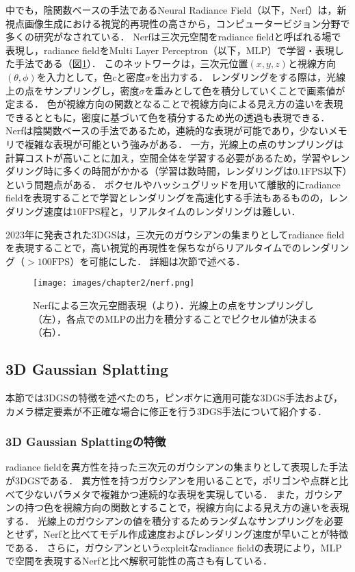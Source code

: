 中でも，陰関数ベースの手法であるNeural Radiance Field（以下，Nerf）\cite{nerf}は，新視点画像生成における視覚的再現性の高さから，コンピュータービジョン分野で多くの研究がなされている．
Nerfは三次元空間をradiance fieldと呼ばれる場で表現し，radiance fieldをMulti Layer Perceptron（以下，MLP）で学習・表現した手法である（図\ref{fig:nerf}）．
このネットワークは，三次元位置$(x,y,z)$と視線方向$(\theta, \phi)$を入力として，色$c$と密度$\sigma$を出力する．
レンダリングをする際は，光線上の点をサンプリングし，密度$\sigma$を重みとして色を積分していくことで画素値が定まる．
色が視線方向の関数となることで視線方向による見え方の違いを表現できるとともに，密度に基づいて色を積分するため光の透過も表現できる．
Nerfは陰関数ベースの手法であるため，連続的な表現が可能であり，少ないメモリで複雑な表現が可能という強みがある．
一方，光線上の点のサンプリングは計算コストが高いことに加え，空間全体を学習する必要があるため，学習やレンダリング時に多くの時間がかかる（学習は数時間，レンダリングは$0.1 \mathrm{FPS}$以下）という問題点がある\cite{3dgs}．
ボクセルやハッシュグリッドを用いて離散的にradiance fieldを表現することで学習とレンダリングを高速化する手法もある\cite{plenoxels}\cite{instant-ngp}ものの，レンダリング速度は$10 \mathrm{FPS}$程と，リアルタイムのレンダリングは難しい．\par

2023年に発表された3DGS\cite{3dgs}は，三次元のガウシアンの集まりとしてradiance fieldを表現することで，高い視覚的再現性を保ちながらリアルタイムでのレンダリング（$>100 \mathrm{FPS}$）を可能にした．
詳細は次節で述べる．
\begin{figure}[h]
  \centering
  \texttt{[image: images/chapter2/nerf.png]}
  \caption[Nerfによる三次元空間表現]{Nerfによる三次元空間表現（\cite{nerf}より）．光線上の点をサンプリングし（左），各点でのMLPの出力を積分することでピクセル値が決まる（右）．}
  \label{fig:nerf}
\end{figure}

\subsection{3D Gaussian Splatting}\label{subsec:3dgs_researches} 
本節では3DGSの特徴を述べたのち，ピンボケに適用可能な3DGS手法および，カメラ標定要素が不正確な場合に修正を行う3DGS手法について紹介する．

\subsubsection{3D Gaussian Splattingの特徴}\label{subsubsec:feature_of_3dgs}
radiance fieldを異方性を持った三次元のガウシアンの集まりとして表現した手法が3DGS\cite{3dgs}である．
異方性を持つガウシアンを用いることで，ポリゴンや点群と比べて少ないパラメタで複雑かつ連続的な表現を実現している．
また，ガウシアンの持つ色を視線方向の関数とすることで，視線方向による見え方の違いを表現する．
光線上のガウシアンの値を積分するためランダムなサンプリングを必要とせず，Nerfと比べてモデル作成速度およびレンダリング速度が早いことが特徴である．
さらに，ガウシアンというexplcitなradiance fieldの表現により，MLPで空間を表現するNerfと比べ解釈可能性の高さも有している．\par


